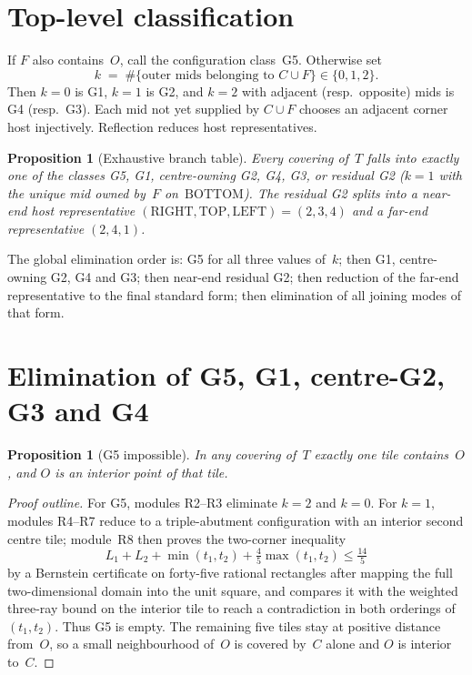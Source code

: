 \documentclass[11pt,reqno]{amsart}
\newtheorem{proposition}[theorem]{Proposition}
\theoremstyle{definition}
\newcommand{\BOTTOM}{\mathrm{BOTTOM}}
\newcommand{\RIGHT}{\mathrm{RIGHT}}
\newcommand{\TOP}{\mathrm{TOP}}
\newcommand{\LEFT}{\mathrm{LEFT}}
\begin{document}
\section{Top-level classification}\label{sec:class}

If $F$ also contains~$O$, call the configuration class~G5.  Otherwise set
\begin{equation}\label{eq:M5}
k \;=\; \#\{\text{outer mids belonging to }C\cup F\}\in\{0,1,2\}.
\end{equation}
Then $k=0$ is G1, $k=1$ is G2, and $k=2$ with adjacent (resp.\ opposite) mids
is G4 (resp.\ G3).  Each mid not yet supplied by $C\cup F$ chooses an adjacent
corner host injectively.  Reflection reduces host representatives.

\begin{proposition}[Exhaustive branch table]\label{prop:M3}
Every covering of~$T$ falls into exactly one of the classes
G5, G1, centre-owning G2, G4, G3, or residual G2
($k=1$ with the unique mid owned by~$F$ on~$\BOTTOM$).
The residual G2 splits into a near-end host representative
$(\RIGHT,\TOP,\LEFT)=(2,3,4)$ and a far-end representative $(2,4,1)$.
\end{proposition}

The global elimination order is: G5 for all three values of~$k$; then G1,
centre-owning G2, G4 and G3; then near-end residual G2; then reduction of the
far-end representative to the final standard form; then elimination of all
joining modes of that form.

\section{Elimination of G5, G1, centre-G2, G3 and G4}\label{sec:early}

\begin{proposition}[G5 impossible]\label{prop:M41}
In any covering of~$T$ exactly one tile contains~$O$, and $O$ is an interior
point of that tile.
\end{proposition}

\begin{proof}[Proof outline]
For G5, modules R2--R3 eliminate $k=2$ and $k=0$.  For $k=1$, modules
R4--R7 reduce to a triple-abutment configuration with an interior second
centre tile; module~R8 then proves the two-corner inequality
\begin{equation}\label{eq:M7}
L_1+L_2+\min(t_1,t_2)+\tfrac45\max(t_1,t_2)\le\tfrac{14}{5}
\end{equation}
by a Bernstein certificate on forty-five rational rectangles after mapping the
full two-dimensional domain into the unit square, and compares it with the
weighted three-ray bound on the interior tile to reach a contradiction in both
orderings of $(t_1,t_2)$.  Thus G5 is empty.  The remaining five tiles stay at
positive distance from~$O$, so a small neighbourhood of~$O$ is covered by~$C$
alone and $O$ is interior to~$C$.
\end{proof}
\end{document}
